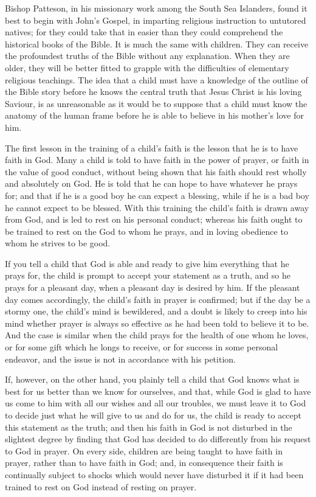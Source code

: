 \documentclass[
]{book}
\begin{document}
Bishop Patteson, in his missionary work among the South Sea Islanders, found it best to begin with John's Gospel, in imparting religious instruction to untutored natives; for they could take that in easier than they could comprehend the historical books of the Bible. It is much the same with children. They can receive the profoundest truths of the Bible without any explanation. When they are older, they will be better fitted to grapple with the difficulties of elementary religious teachings. The idea that a child must have a knowledge of the outline of the Bible story before he knows the central truth that Jesus Christ is his loving Saviour, is as unreasonable as it would be to suppose that a child must know the anatomy of the human frame before he is able to believe in his mother's love for him.

The first lesson in the training of a child's faith is the lesson that he is to have faith in God. Many a child is told to have faith in the power of prayer, or faith in the value of good conduct, without being shown that his faith should rest wholly and absolutely on God. He is told that he can hope to have whatever he prays for; and that if he is a good boy he can expect a blessing, while if he is a bad boy he cannot expect to be blessed. With this training the child's faith is drawn away from God, and is led to rest on his personal conduct; whereas his faith ought to be trained to rest on the God to whom he prays, and in loving obedience to whom he strives to be good.

If you tell a child that God is able and ready to give him everything that he prays for, the child is prompt to accept your statement as a truth, and so he prays for a pleasant day, when a pleasant day is desired by him. If the pleasant day comes accordingly, the child's faith in prayer is confirmed; but if the day be a stormy one, the child's mind is bewildered, and a doubt is likely to creep into his mind whether prayer is always so effective as he had been told to believe it to be. And the case is similar when the child prays for the health of one whom he loves, or for some gift which he longs to receive, or for success in some personal endeavor, and the issue is not in accordance with his petition.

If, however, on the other hand, you plainly tell a child that God knows what is best for us better than we know for ourselves, and that, while God is glad to have us come to him with all our wishes and all our troubles, we must leave it to God to decide just what he will give to us and do for us, the child is ready to accept this statement as the truth; and then his faith in God is not disturbed in the slightest degree by finding that God has decided to do differently from his request to God in prayer. On every side, children are being taught to have faith in prayer, rather than to have faith in God; and, in consequence their faith is continually subject to shocks which would never have disturbed it if it had been trained to rest on God instead of resting on prayer.
\end{document}
